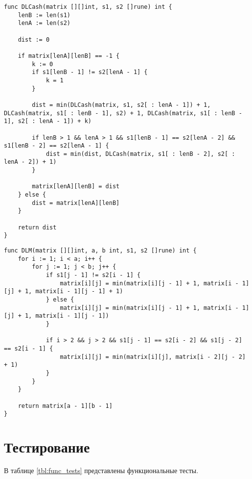 \begin{lstlisting}[label=lst:DLCash,caption=Функция нахождения расстояния Левенштейна-Дамерау с помощью рекурсии и кэша]
func DLCash(matrix [][]int, s1, s2 []rune) int {
    lenB := len(s1)
    lenA := len(s2)

    dist := 0

    if matrix[lenA][lenB] == -1 {
        k := 0
        if s1[lenB - 1] != s2[lenA - 1] {
            k = 1
        }

        dist = min(DLCash(matrix, s1, s2[ : lenA - 1]) + 1, DLCash(matrix, s1[ : lenB - 1], s2) + 1, DLCash(matrix, s1[ : lenB - 1], s2[ : lenA - 1]) + k)

        if lenB > 1 && lenA > 1 && s1[lenB - 1] == s2[lenA - 2] && s1[lenB - 2] == s2[lenA - 1] {
            dist = min(dist, DLCash(matrix, s1[ : lenB - 2], s2[ : lenA - 2]) + 1)
        }

        matrix[lenA][lenB] = dist
    } else {
        dist = matrix[lenA][lenB]
    }

    return dist
}
\end{lstlisting}

\begin{lstlisting}[label=lst:DLM,caption=Функция нахождения расстояния Дамерау-Левенштейна нерекурсивным способом]
func DLM(matrix [][]int, a, b int, s1, s2 []rune) int {
    for i := 1; i < a; i++ {
        for j := 1; j < b; j++ {
            if s1[j - 1] != s2[i - 1] {
                matrix[i][j] = min(matrix[i][j - 1] + 1, matrix[i - 1][j] + 1, matrix[i - 1][j - 1] + 1)
            } else {
                matrix[i][j] = min(matrix[i][j - 1] + 1, matrix[i - 1][j] + 1, matrix[i - 1][j - 1])
            }

            if i > 2 && j > 2 && s1[j - 1] == s2[i - 2] && s1[j - 2] == s2[i - 1] {
                matrix[i][j] = min(matrix[i][j], matrix[i - 2][j - 2] + 1)
            }
        }
    }

    return matrix[a - 1][b - 1]
}
\end{lstlisting}

\section{Тестирование}

В таблице \ref{tbl:func_tests} представлены функциональные тесты.

